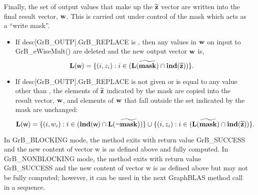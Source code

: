 Finally, the set of output values that make up the ${\bf \widetilde{z}}$ 
vector are written into the final result vector, ${\bf w}$. 
This is carried out under control of the mask which acts as a ``write mask''.
\begin{itemize}
\item If {\sf desc[GrB\_OUTP].GrB\_REPLACE} is \true, then any values in ${\bf w}$ 
on input to {\sf GrB\_eWiseMult()} are deleted and the new output vector ${\bf w}$ is,
\[ \bold{L}({\sf w}) = \{(i,z_{i}) : i \in (\bold{L}({\bf \widetilde{mask}}) 
\cap \bold{ind}({\bf \widetilde{z}})) \}. \]

\item If {\sf desc[GrB\_OUTP].GrB\_REPLACE} is not given or is equal to any 
value other than \true, the elements of ${\bf \widetilde{z}}$ indicated by 
the mask are copied into the result vector, ${\bf w}$, and elements of 
${\bf w}$ that fall outside the set indicated by the mask are unchanged:
\[ \bold{L}({\sf w}) = \{(i,w_{i}) : i \in (\bold{ind}({\bf \sf w}) 
\cap \bold{L}(\neg {\bf \widetilde{mask}})) \} \cup \{(i,z_{i}) : i \in 
(\bold{L}({\bf \widetilde{mask}}) \cap \bold{ind}({\bf \widetilde{z}})) \}. \]
\end{itemize}

In {\sf GrB\_BLOCKING} mode, the method exits with return value 
{\sf GrB\_SUCCESS} and the new content of vector {\sf w} is as defined above
and fully computed.  
In {\sf GrB\_NONBLOCKING} mode, the method exits with return value 
{\sf GrB\_SUCCESS} and the new content of vector {\sf w} is as defined above 
but may not be fully computed; however, it can be used in the next GraphBLAS 
method call in a sequence.


